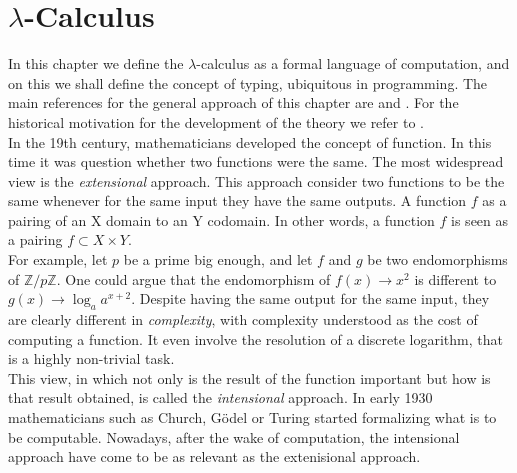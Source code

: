 

\chapter{$\lambda$-Calculus}
\thispagestyle{empty}
In this chapter we define the $\lambda$-calculus as a formal language of computation, and on this we shall define the concept of typing, ubiquitous in programming. The main references  for the general approach of this chapter are \cite{selinger2008lecture} and \cite{hindley2008lambda}. For the historical motivation for the development of the theory  we refer to \cite{cardone2006history}.  \\

In the 19th century, mathematicians developed the concept of function. In this time it was question whether two functions were the same. The most widespread view is the \emph{extensional} approach. This approach consider two functions to be the same whenever for the same input they have the same outputs. A function $f$ as a pairing of an X domain to an Y codomain. In other words, a function $f$ is seen as a pairing $f\subset X \times Y$.\\

For example, let $p$ be a prime big enough, and let $f$ and $g$ be two endomorphisms of  $\mathbb{Z}/p\mathbb{Z}$. One could argue that the endomorphism of  $f(x)\to x^2$ is different to $g(x) \to \log_a a^{x+2}$. Despite having the same output for the same input, they are clearly different in \emph{complexity}, with complexity understood as the cost of computing a function. It even involve the resolution of a discrete logarithm, that is a highly non-trivial task. \\

This view, in which not only is the result of the function important but how is that result obtained, is called the \emph{intensional} approach. In early 1930 mathematicians such as Church\cite{church1932set}, Gödel\cite{adams2011early} or Turing\cite{turing1938computable} started formalizing what is to be computable. Nowadays, after the wake of computation, the intensional approach have come to be as relevant as the extenisional approach.




